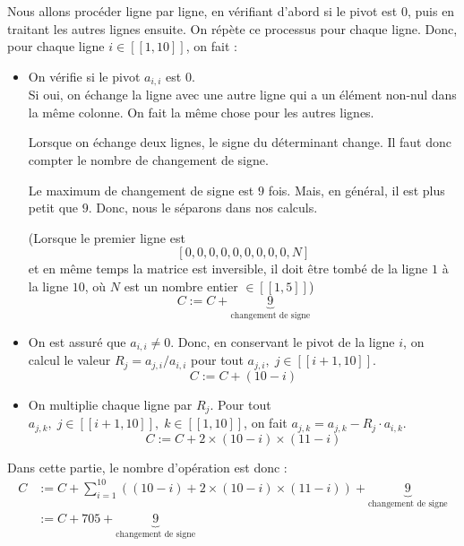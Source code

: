 \documentclass{article}
\begin{document}
Nous allons procéder ligne par ligne, en vérifiant d'abord si le pivot est 0, puis en traitant les autres lignes ensuite. On répète ce processus pour chaque ligne. Donc, pour chaque ligne $i \in [\![1, 10]\!]$, on fait :
\begin{itemize}
    \item On vérifie si le pivot $a_{i, i}$ est 0. \\
        Si oui, on échange la ligne avec une autre ligne qui a un élément non-nul dans la même colonne. On fait la même chose pour les autres lignes.
        \begin{tcolorbox}[title={Notice}, colback=red!5!white,colframe=red!75!black, fonttitle = \bfseries \sffamily]
            Lorsque on échange deux lignes, le signe du déterminant change. Il faut donc compter le nombre de changement de signe.

            Le maximum de changement de signe est $9$ fois. Mais, en général, il est plus petit que $9$. Donc, nous le séparons dans nos calculs.

            (Lorsque le premier ligne est $$[0, 0, 0, 0, 0, 0, 0, 0, 0, N]$$ et en même temps la matrice est inversible, il doit être tombé de la ligne $1$ à la ligne $10$, où $N$ est un nombre entier $\in [\![1,5]\!]$)
            \[
                C := C + \underbrace{9}_{\text{changement de signe}}
            \]
            
        \end{tcolorbox}
    \item On est assuré que $a_{i, i} \ne 0$. Donc, en conservant le pivot de la ligne $i$, on calcul le valeur $R_j = a_{j,i}/a_{i,i}$ pour tout $a_{j, i},\; j \in [\![i+1, 10]\!]$. \[
    C := C + (10-i)
    \]
    
    \item On multiplie chaque ligne par $R_j$. Pour tout $a_{j, k},\; j \in [\![i+1, 10]\!],\; k \in [\![1, 10]\!]$, on fait $a_{j, k} = a_{j, k} - R_j \cdot a_{i, k}$. \[
    C := C + 2 \times  (10 - i) \times  (11 -i)
    \]
\end{itemize}

\begin{tcolorbox}
Dans cette partie, le nombre d'opération est donc :
\begin{align*}
    C &:= C + \sum_{i=1}^{10} \left( (10-i) + 2 \times  (10 - i) \times  (11 -i) \right) + \underbrace{9}_{\text{changement de signe}} \\
      &:= C + 705 + \underbrace{9}_{\text{changement de signe}}
\end{align*}
    
\end{tcolorbox}
\end{document}
